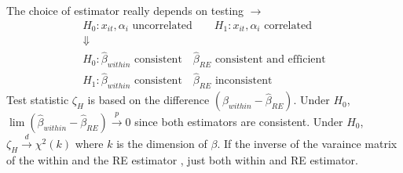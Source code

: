The choice of estimator really depends on testing $\to$ 
\begin{gather*}
    H_0: x_{it}, \alpha_i\text{ uncorrelated}\qquad H_1: x_{it}, \alpha_i\text{ correlated}\\
    \Downarrow\\
    H_0: \hat{\beta}_{within}\text{ consistent}\quad \hat{\beta}_{RE}\text{ consistent and efficient}\\
    H_1: \hat{\beta}_{within}\text{ consistent}\quad \hat{\beta}_{RE}\text{ inconsistent}
\end{gather*}
Test statistic $\zeta_{H}$ is based on the difference $(\hat{\beta}_{within}-\hat{\beta}_{RE})$.
Under $H_0$, $\lim(\hat{\beta}_{within}-\hat{\beta}_{RE})\xrightarrow{p}0$ since both estimators are consistent.
Under $H_0$, $\zeta_{H}\xrightarrow{d}\chi^2(k)$ where $k$ is the dimension of $\beta$.
If the inverse of the varaince matrix of the within and the RE estimator , just  both within and RE estimator.  


